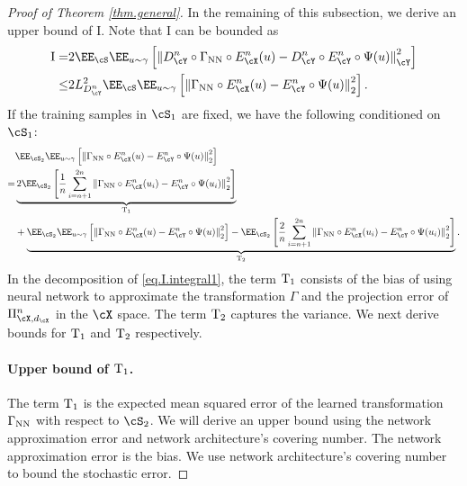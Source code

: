 \documentclass[11pt]{article} %
\begin{document}
\begin{proof}[Proof of Theorem \ref{thm.general}]
In the remaining of this subsection, we derive an upper bound of I. Note that I can be bounded as
\begin{align}
	{\rm I}=& 2\EE_{\cS}\EE_{u\sim \gamma}\left[\left\|D_{\cY}^n\circ \Gamma_{\rm NN} \circ E_{\cX}^n(u)-D_{\cY}^n\circ E_{\cY}^n\circ \Psi(u)\right\|_{\cY}^2\right] \nonumber\\
	\leq & 2L_{D^n_{\cY}}^2\EE_{\cS}\EE_{u\sim \gamma}\left[\left\| \Gamma_{\rm NN} \circ E_{\cX}^n(u)- E_{\cY}^n\circ \Psi(u)\right\|_{2}^2\right] .
	\label{eq.I}
\end{align}
If the training samples in $\cS_1$ are fixed, we have the following conditioned on $\cS_1$:
\begin{align}
	&\EE_{\cS_2}\EE_{u\sim \gamma}\left[\left\| \Gamma_{\rm NN} \circ E_{\cX}^n(u)- E_{\cY}^n\circ\Psi(u)\right\|_{2}^2\right]\nonumber\\
	=& \underbrace{2\EE_{\cS_2}\left[\frac{1}{n}\sum_{i=n+1}^{2n}\left\| \Gamma_{\rm NN} \circ E_{\cX}^n(u_i)-E_{\cY}^n\circ\Psi(u_i)\right\|_{2}^2\right]}_{\rm T_1}\nonumber\\
	&+\underbrace{\EE_{\cS_2}\EE_{u\sim \gamma}\left[\left\| \Gamma_{\rm NN} \circ E_{\cX}^n(u)- E_{\cY}^n\circ\Psi(u)\right\|_{2}^2\right]
	- \EE_{\cS_2}\left[\frac{2}{n}\sum_{i=n+1}^{2n}\left\| \Gamma_{\rm NN} \circ E_{\cX}^n(u_i)- E_{\cY}^n\circ\Psi(u_i)\right\|_{2}^2\right]}_{\rm T_2}.
\label{eq.I.integral1}
\end{align}
In the decomposition of \eqref{eq.I.integral1}, the term ${\rm T_1}$ consists of the bias of using neural network to approximate the transformation $\Gamma$ and the projection error of $\Pi_{\cX,d_{\cX}}^n$ in the $\cX$ space. The term ${\rm T_2}$ captures the variance. We next derive bounds for ${\rm T_1}$ and ${\rm T_2}$ respectively.

\paragraph{Upper bound of ${\rm T_1}$.}
The term ${\rm T_1}$ is the expected mean squared error of the learned transformation $\Gamma_{\rm NN}$ with respect to $\cS_2$. We will derive an upper bound using the network approximation error and network architecture's covering number. The network approximation error is the bias. We use network architecture's covering number to bound the stochastic error. 


\end{proof}
\end{document}
